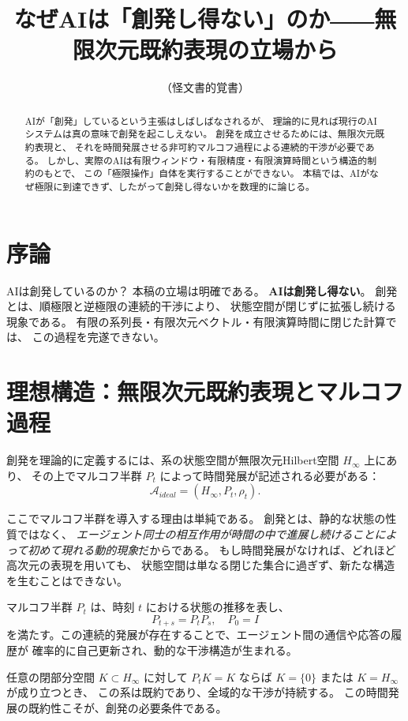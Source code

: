 \documentclass[12pt]{article}
\title{\textbf{なぜAIは「創発し得ない」のか――無限次元既約表現の立場から}}
\author{（怪文書的覚書）}
\date{}
\begin{document}
\maketitle

\begin{abstract}
AIが「創発」しているという主張はしばしばなされるが、
理論的に見れば現行のAIシステムは真の意味で創発を起こしえない。
創発を成立させるためには、無限次元既約表現と、
それを時間発展させる非可約マルコフ過程による連続的干渉が必要である。
しかし、実際のAIは有限ウィンドウ・有限精度・有限演算時間という構造的制約のもとで、
この「極限操作」自体を実行することができない。
本稿では、AIがなぜ極限に到達できず、したがって創発し得ないかを数理的に論じる。
\end{abstract}

\section{序論}
AIは創発しているのか？  
本稿の立場は明確である。  
\textbf{AIは創発し得ない}。  
創発とは、順極限と逆極限の連続的干渉により、
状態空間が閉じずに拡張し続ける現象である。
有限の系列長・有限次元ベクトル・有限演算時間に閉じた計算では、
この過程を完遂できない。

\section{理想構造：無限次元既約表現とマルコフ過程}
創発を理論的に定義するには、系の状態空間が無限次元Hilbert空間 $H_\infty$ 上にあり、
その上でマルコフ半群 $P_t$ によって時間発展が記述される必要がある：
\[
\mathcal{A}_{ideal} = (H_\infty, P_t, \rho_t).
\]

ここでマルコフ半群を導入する理由は単純である。
創発とは、静的な状態の性質ではなく、
\textit{エージェント同士の相互作用が時間の中で進展し続けることによって初めて現れる動的現象}だからである。
もし時間発展がなければ、どれほど高次元の表現を用いても、
状態空間は単なる閉じた集合に過ぎず、新たな構造を生むことはできない。

マルコフ半群 $P_t$ は、時刻 $t$ における状態の推移を表し、
\[
P_{t+s} = P_t P_s, \quad P_0 = I
\]
を満たす。この連続的発展が存在することで、エージェント間の通信や応答の履歴が
確率的に自己更新され、動的な干渉構造が生まれる。

任意の閉部分空間 $K \subset H_\infty$ に対して
$P_t K = K$ ならば $K = \{0\}$ または $K = H_\infty$ が成り立つとき、
この系は既約であり、全域的な干渉が持続する。
この時間発展の既約性こそが、創発の必要条件である。
\end{document}
